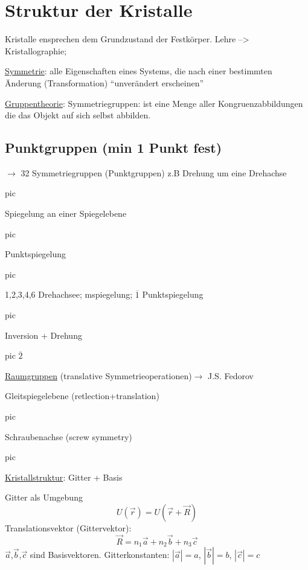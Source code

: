 



\tableofcontents
\setcounter{chapter}{1}
\chapter{Struktur der Kristalle}

Kristalle ensprechen dem Grundzustand der Festkörper. Lehre --> Kristallographie;

\underline{Symmetrie}: alle Eigenschaften eines Systems, die nach einer bestimmten
Änderung (Transformation) ``unverändert erscheinen''

\underline{Gruppentheorie}:
Symmetriegruppen: ist eine Menge aller Kongruenzabbildungen die das Objekt auf
sich selbst abbilden.





\section{Punktgruppen (min 1 Punkt fest)}
\(\rightarrow\) 32 Symmetriegruppen (Punktgruppen)
z.B Drehung um eine Drehachse

pic

Spiegelung an einer Spiegelebene


pic

Punktspiegelung

pic


1,2,3,4,6 Drehachsee;
mspiegelung;
\(\overline 1\) Punktspiegelung

pic

Inversion + Drehung

pic \(\overline 2\)

\underline{Raumgruppen} (translative Symmetrieoperationen)\(\rightarrow\) J.S. Fedorov 

Gleitspiegelebene (retlection+translation)

pic

Schraubenachse (screw symmetry)

pic


\underline{Kristallstruktur}: Gitter + Basis

Gitter als Umgebung 
\[U(\vec r)=U(\vec r +\vec R)\]
Translationsvektor (Gittervektor):
\[ \vec R = n_1\vec a+ n_2\vec b+ n_3\vec c\]
\(\vec a\),\(\vec b\),\(\vec c\) sind Basisvektoren. Gitterkonstanten: \(|\vec a|=a\),
\(|\vec b|=b\), \(|\vec c|=c\)

